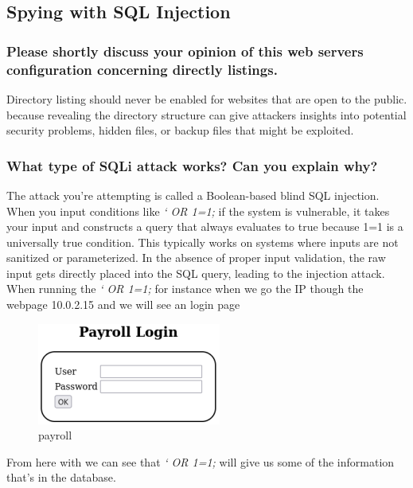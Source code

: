 \subsection{Spying with SQL Injection}

\subsubsection{Please shortly discuss your opinion of this web servers configuration concerning directly listings.}
Directory listing should never  be enabled for websites that are open to the public. because revealing the
directory structure can give attackers insights into potential security problems, hidden files, or
backup files that might be exploited.


\subsubsection{What type of SQLi attack works? Can you explain why?}
The attack you're attempting is called a Boolean-based blind SQL injection. When you input
conditions like \textit{‘ OR 1=1;} if the system is vulnerable, it takes your input and constructs a
query that always evaluates to true because 1=1 is a universally true condition. This typically
works on systems where inputs are not sanitized or parameterized. In the absence of proper
input validation, the raw input gets directly placed into the SQL query, leading to the injection
attack.
When running the \textit{‘ OR 1=1;} for instance when we go the IP though the webpage
10.0.2.15 and we will see an login page

\begin{figure}[H]
    \centering
    \includegraphics[width=0.3\linewidth]{pic/payroll.png}
    \caption{payroll}
    \label{fig:payroll}
\end{figure}

From here with we can see that \textit{‘ OR 1=1;} will give us some of the information that's in the
database.

